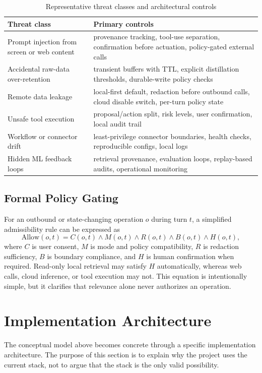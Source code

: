 \documentclass[conference]{IEEEtran}
\begin{document}
\begin{table}[t]
\caption{Representative threat classes and architectural controls}
\label{tab:threats}
\centering
\begin{tabular}{p{} p{}}
\toprule
\textbf{Threat class} & \textbf{Primary controls} \\
\midrule
Prompt injection from screen or web content & provenance tracking, tool-use separation, confirmation before actuation, policy-gated external calls \\
Accidental raw-data over-retention & transient buffers with TTL, explicit distillation thresholds, durable-write policy checks \\
Remote data leakage & local-first default, redaction before outbound calls, cloud disable switch, per-turn policy state \\
Unsafe tool execution & proposal/action split, risk levels, user confirmation, local audit trail \\
Workflow or connector drift & least-privilege connector boundaries, health checks, reproducible configs, local logs \\
Hidden ML feedback loops & retrieval provenance, evaluation loops, replay-based audits, operational monitoring \\
\bottomrule
\end{tabular}
\end{table}

\subsection{Formal Policy Gating}
For an outbound or state-changing operation $o$ during turn $t$, a simplified admissibility rule can be expressed as
\begin{equation}
\label{eq:policy}
\mathrm{Allow}(o,t) =
C(o,t) \land M(o,t) \land R(o,t) \land B(o,t) \land H(o,t),
\end{equation}
where $C$ is user consent, $M$ is mode and policy compatibility, $R$ is redaction sufficiency, $B$ is boundary compliance, and $H$ is human confirmation when required. Read-only local retrieval may satisfy $H$ automatically, whereas web calls, cloud inference, or tool execution may not. This equation is intentionally simple, but it clarifies that relevance alone never authorizes an operation.

\section{Implementation Architecture}
The conceptual model above becomes concrete through a specific implementation architecture. The purpose of this section is to explain why the project uses the current stack, not to argue that the stack is the only valid possibility.
\end{document}
